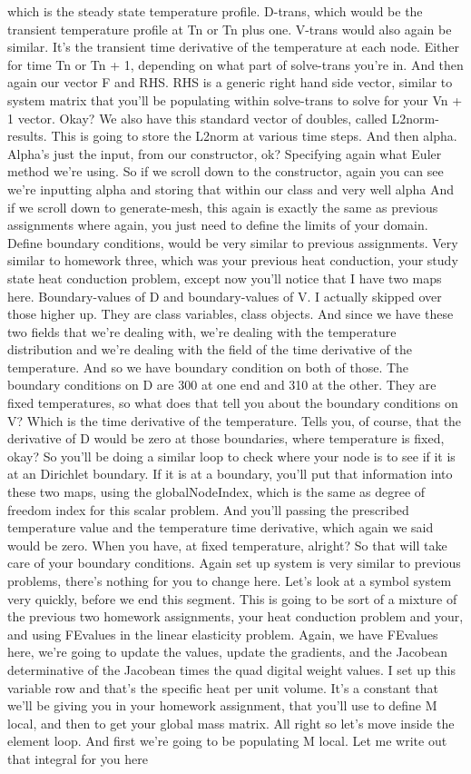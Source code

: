 \documentclass[10pt]{article}
\begin{document}
which is the steady state temperature profile. D-trans, which would be the transient temperature profile at Tn or Tn plus one. V-trans would also again be similar. It's the transient time derivative of the temperature at each node. Either for time Tn or Tn + 1, depending on what part of solve-trans you're in. And then again our vector F and RHS. RHS is a generic right hand side vector, similar to system matrix that you'll be populating within solve-trans to solve for your Vn + 1 vector. Okay? We also have this standard vector of doubles, called L2norm-results. This is going to store the L2norm at various time steps. And then alpha. Alpha's just the input, from our constructor, ok? Specifying again what Euler method we're using. So if we scroll down to the constructor, again you can see we're inputting alpha and storing that within our class and very well alpha And if we scroll down to generate-mesh, this again is exactly the same as previous assignments where again, you just need to define the limits of your domain. Define boundary conditions, would be very similar to previous assignments. Very similar to homework three, which was your previous heat conduction, your study state heat conduction problem, except now you'll notice that I have two maps here. Boundary-values of D and boundary-values of V. I actually skipped over those higher up. They are class variables, class objects. And since we have these two fields that we're dealing with, we're dealing with the temperature distribution and we're dealing with the field of the time derivative of the temperature. And so we have boundary condition on both of those. The boundary conditions on D are 300 at one end and 310 at the other. They are fixed temperatures, so what does that tell you about the boundary conditions on V? Which is the time derivative of the temperature. Tells you, of course, that the derivative of D would be zero at those boundaries, where temperature is fixed, okay? So you'll be doing a similar loop to check where your node is to see if it is at an Dirichlet boundary. If it is at a boundary, you'll put that information into these two maps, using the globalNodeIndex, which is the same as degree of freedom index for this scalar problem. And you'll passing the prescribed temperature value and the temperature time derivative, which again we said would be zero. When you have, at fixed temperature, alright? So that will take care of your boundary conditions. Again set up system is very similar to previous problems, there's nothing for you to change here. Let's look at a symbol system very quickly, before we end this segment. This is going to be sort of a mixture of the previous two homework assignments, your heat conduction problem and your, and using FEvalues in the linear elasticity problem. Again, we have FEvalues here, we're going to update the values, update the gradients, and the Jacobean determinative of the Jacobean times the quad digital weight values. I set up this variable row and that's the specific heat per unit volume. It's a constant that we'll be giving you in your homework assignment, that you'll use to define M local, and then to get your global mass matrix. All right so let's move inside the element loop. And first we're going to be populating M local. Let me write out that integral for you here 
\end{document}
